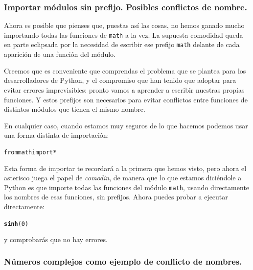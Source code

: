 \documentclass[10pt,a4paper]{article}\usepackage[]{graphicx}\usepackage[]{color}
\makeatletter
\newcommand{\hlnum}[1]{\textcolor[rgb]{0.686,0.059,0.569}{#1}}%
\newcommand{\hlstd}[1]{\textcolor[rgb]{0.345,0.345,0.345}{#1}}%
\newcommand{\hlkwd}[1]{\textcolor[rgb]{0.737,0.353,0.396}{\textbf{#1}}}%
\newenvironment{kframe}{%
 \def\at@end@of@kframe{}%
 \ifinner\ifhmode%
  \def\at@end@of@kframe{\end{minipage}}%
  \begin{minipage}{\columnwidth}%
 \fi\fi%
 \def\FrameCommand##1{\hskip\@totalleftmargin \hskip-\fboxsep
 \colorbox{shadecolor}{##1}\hskip-\fboxsep
     \hskip-\linewidth \hskip-\@totalleftmargin \hskip\columnwidth}%
 \MakeFramed {\advance\hsize-\width
   \@totalleftmargin\z@ \linewidth\hsize
   \@setminipage}}%
 {\par\unskip\endMakeFramed%
 \at@end@of@kframe}
\newenvironment{knitrout}{}{} %
\makeatother
\begin{document}
\subsubsection*{Importar módulos sin prefijo. Posibles conflictos de nombre.}
\label{tut02:subsubsec:ImportarModulosSinPrefijo}

Ahora es posible que pienses que, puestas así las cosas, no hemos ganado mucho importando todas las funciones de {\tt math} a la vez. La supuesta comodidad queda en parte eclipsada por la necesidad de escribir ese prefijo {\tt math} delante de cada aparición de una función del módulo.

Creemos que es conveniente que comprendas el problema que se plantea para los desarrolladores de Python, y el compromiso que han tenido que adoptar para evitar errores imprevisibles: pronto vamos a aprender a escribir nuestras propias funciones. Y estos prefijos son necesarios para evitar conflictos entre funciones de distintos módulos que tienen el mismo nombre.

En cualquier caso, cuando estamos muy seguros de lo que hacemos podemos usar una forma distinta de importación:
\begin{knitrout}
\color{fgcolor}\begin{kframe}
\begin{alltt}
from math import *
\end{alltt}
\end{kframe}
\end{knitrout}
Esta forma de importar te recordará a la primera que hemos visto, pero ahora el asterisco juega el papel de {\em comodín}, de manera que lo que estamos diciéndole a Python es que importe todas las funciones del módulo {\tt math}, usando directamente los nombres de esas funciones, sin prefijos. Ahora puedes probar a ejecutar directamente:
\begin{knitrout}
\color{fgcolor}\begin{kframe}
\begin{alltt}
\hlkwd{sinh}\hlstd{(}\hlnum{0}\hlstd{)}
\end{alltt}
\end{kframe}
\end{knitrout}
y comprobarás que no hay errores.

\subsubsection*{Números complejos como ejemplo de conflicto de nombres.}
\label{tut02:subsubsec:NumerosComplejosConflictoNombres}
\end{document}
